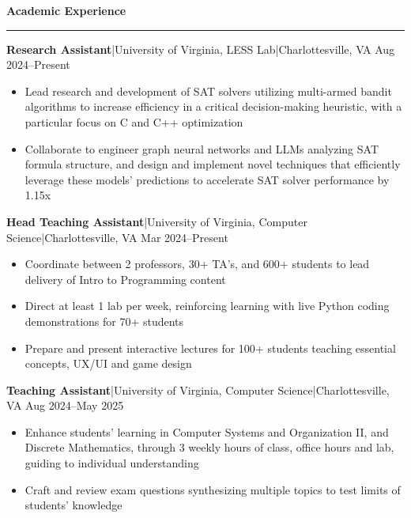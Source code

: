 \documentclass[11pt,letterpaper]{article}
\newcommand{\horibar}[2]{#1\hspace{5pt}|\hspace{5pt}#2}
\newcommand{\sep}[1]{\par\vspace{#1}}
\renewenvironment{section}[1]{
\sep{11pt}
{
\fontsize{14}{2}
\selectfont
\textbf{#1}\\[0.5pt]
}
\sep{4pt}
\noindent\rule{\linewidth}{0.5pt}
\sep{4pt}
}
{
}
\renewenvironment{subsection}[3]
{
\sep{4pt}
\horibar{\textbf{#1}}{#2} \hfill #3
\par\setstretch{1}
\begin{itemize}
}
{
\end{itemize}
\setstretch{0}
}
\begin{document}
\begin{section}{Academic Experience}
    \begin{subsection}{Research Assistant}{\horibar{University of Virginia, LESS Lab}{Charlottesville, VA}}{Aug 2024–Present}
        \item Lead research and development of SAT solvers utilizing multi-armed bandit algorithms to increase efficiency in a critical decision-making heuristic, with a particular focus on C and C++ optimization
        \item Collaborate to engineer graph neural networks and LLMs analyzing SAT formula structure, and design and implement novel techniques that efficiently leverage these models' predictions to accelerate SAT solver performance by 1.15x
    \end{subsection}
    \begin{subsection}{Head Teaching Assistant}{\horibar{University of Virginia, Computer Science}{Charlottesville, VA}}{Mar 2024–Present}
        \item Coordinate between 2 professors, 30+ TA's, and 600+ students to lead delivery of Intro to Programming content
        \item Direct at least 1 lab per week, reinforcing learning with live Python coding demonstrations for 70+ students
        \item Prepare and present interactive lectures for 100+ students teaching essential concepts, UX/UI and game design
    \end{subsection}
    \begin{subsection}{Teaching Assistant}{\horibar{University of Virginia, Computer Science}{Charlottesville, VA}}{Aug 2024–May 2025}
        \item Enhance students’ learning in Computer Systems and Organization II, and Discrete Mathematics, through 3 weekly hours of class, office hours and lab, guiding to individual understanding
        \item Craft and review exam questions synthesizing multiple topics to test limits of students’ knowledge
    \end{subsection}
\end{section}
\end{document}
